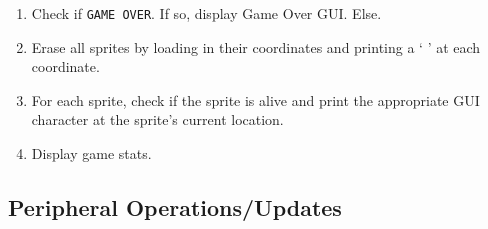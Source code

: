     \begin{enumerate}
      \item Check if \texttt{GAME OVER}. If so, display Game Over GUI. Else.
      \item Erase all sprites by loading in their coordinates and printing a ` ' at each coordinate.
      \item For each sprite, check if the sprite is alive and print the appropriate GUI character at the sprite's current location.
      \item Display game stats.
    \end{enumerate}


  \subsection{Peripheral Operations/Updates}

